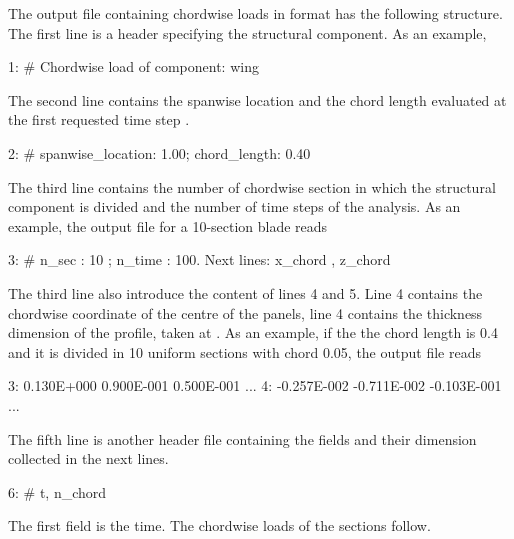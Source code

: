 The output file containing chordwise loads in  format has 
the following structure. The first line is a header specifying the 
structural component. As an example,
\begin{inputfile}[frame=single]
  1: # Chordwise load of component: wing
\end{inputfile}
The second line contains the spanwise location and the chord length evaluated at the first requested
time step .  
\begin{inputfile}[frame=single]
  2: # spanwise_location:    1.00; chord_length:  0.40     
\end{inputfile}
The third line contains the number of chordwise section  in which the 
structural component is divided and the number of time steps 
of the analysis. As an example, the output file for a 10-section blade reads
\begin{inputfile}[frame=single]
  3: # n_sec : 10 ; n_time : 100. Next lines: x_chord , z_chord
\end{inputfile}
The third line also introduce the content of lines 4 and 5. Line 4 contains 
the chordwise coordinate  of the centre of the panels, 
line 4 contains the thickness dimension  of the profile, taken at .
As an example, if the the chord length is 0.4 and it is divided in 10 uniform sections with chord 0.05, 
the output file reads
\begin{inputfile}[frame=single]
  3:  0.130E+000  0.900E-001  0.500E-001 ...
  4: -0.257E-002 -0.711E-002 -0.103E-001 ...
\end{inputfile}
The fifth line is another header file containing the fields and their 
dimension collected in the next  lines.
\begin{inputfile}[frame=single]
  6: # t, n_chord
\end{inputfile}
The first field is the time. The chordwise loads of the  
sections follow. 

